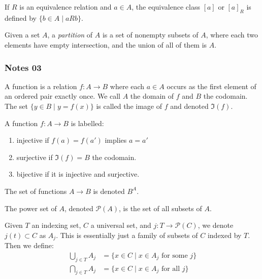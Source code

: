 \documentclass[12pt,letterpaper,reqno]{article}
\begin{document}
\begin{definition}\label{def:equivalence-class}
    If $R$ is an equivalence relation and $a \in A$, the equivalence class $[a]$ or $[a]_{R}$ is defined by $\{ b \in A \mid aRb \}$.
\end{definition}

\begin{definition}[Partition]\label{def:partition}
    Given a set $A$, a \textit{partition} of $A$ is a set of nonempty subsets of $A$, where each two elements have empty intersection, and the union of all of them is $A$.
\end{definition}

\subsubsection{Notes 03}

\begin{definition}[Function]\label{def:function}
    A function is a relation $f: A \to B$ where each $a \in A$ occurs as the first element of an ordered pair exactly once. We call $A$ the domain of $f$ and $B$ the codomain. The set $\{ y \in B \mid y = f(x) \}$ is called the image of $f$ and denoted $\Im(f)$.
\end{definition}

\begin{definition}\label{def:inj-surj-bij}
    A function $f: A \to B$ is labelled:
    \begin{enumerate}
        \item injective if $f(a) = f(a')$ implies $a = a'$
        \item surjective if $\Im(f) = B$ the codomain.
        \item bijective if it is injective and surjective.
    \end{enumerate}
\end{definition}

\begin{definition}\label{def:function-space}
    The set of functions $A \to B$ is denoted $B^{A}$.
\end{definition}

\begin{definition}\label{def:power-set}
    The power set of $A$, denoted $\mathcal{P}(A)$, is the set of all subsets of $A$.
\end{definition}

\begin{definition}\label{def:arb-union-intersection}
    Given $T$ an indexing set, $C$ a universal set, and $j: T \to \mathcal{P}(C)$, we denote $j(t) \subset C$ as $A_{j}$. This is essentially just a family of subsets of $C$ indexed by $T$. Then we define:
    \begin{align*}
        \bigcup_{j \in T} A_{j} &= \{ x \in C \mid x \in A_{j} \text{ for some } j\} \\
        \bigcap_{j \in T} A_{j} &= \{ x \in C \mid x \in A_{j} \text{ for all } j\}
    \end{align*}
\end{definition}
\end{document}
